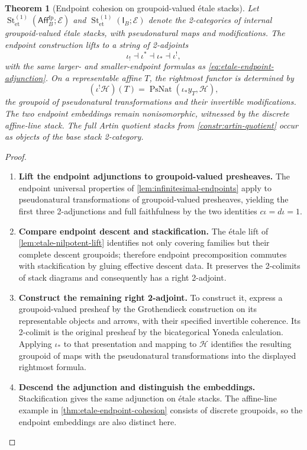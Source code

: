 \documentclass[11pt,a4paper]{article}
\numberwithin{algorithm}{section}
\numberwithin{equation}{section}
\newtheorem{theorem}{Theorem}[section]
\theoremstyle{definition}
\theoremstyle{remark}
\theoremstyle{plain}
\newcommand{\E}{\mathcal E}
\newcommand{\AffB}{\mathsf{Aff}^{\mathrm{fp}}_B}
\newcommand{\InfB}{\mathsf I_B}
\newcommand{\StEt}{\operatorname{St}_{\mathrm{et}}}
\theoremstyle{definition}
\theoremstyle{plain}
\begin{document}
\begin{theorem}[Endpoint cohesion on groupoid-valued \'etale stacks]
\label{thm:etale-stacky-endpoints}
Let $\StEt^{(1)}(\AffB;\E)$ and
$\StEt^{(1)}(\InfB;\E)$ denote the 2-categories of
internal groupoid-valued \'etale stacks, with pseudonatural
maps and modifications.  The endpoint construction lifts to
a string of 2-adjoints
\[
 \iota_!\dashv\iota^*\dashv\iota_*\dashv\iota^!,
\]
with the same larger- and smaller-endpoint formulas as
\eqref{eq:etale-endpoint-adjunction}.  On a representable
affine $T$, the rightmost functor is determined by
\[
 (\iota^!\mathcal H)(T)
 =\operatorname{PsNat}(\iota_*y_T,\mathcal H),
\]
the groupoid of pseudonatural transformations and their
invertible modifications.  The two endpoint embeddings remain
nonisomorphic, witnessed by the discrete affine-line stack.
The full Artin quotient stacks from
\cref{constr:artin-quotient} occur as objects of the base
stack 2-category.
\end{theorem}
\begin{proof}\leavevmode
\begin{enumerate}[leftmargin=*,align=left]
\item \textbf{Lift the endpoint adjunctions to groupoid-valued presheaves.}
The endpoint universal properties of
\cref{lem:infinitesimal-endpoints} apply to pseudonatural
transformations of groupoid-valued presheaves, yielding the
first three 2-adjunctions and full faithfulness by the two
identities $c\iota=d\iota=1$.

\item \textbf{Compare endpoint descent and stackification.}
The \'etale lift of
\cref{lem:etale-nilpotent-lift} identifies not only
covering families but their complete descent groupoids;
therefore endpoint precomposition commutes with stackification
by gluing effective descent data.  It preserves the
2-colimits of stack diagrams and consequently has a right
2-adjoint.

\item \textbf{Construct the remaining right 2-adjoint.}
To construct it, express a groupoid-valued presheaf by the
Grothendieck construction on its representable objects and
arrows, with their specified invertible coherence.  Its
2-colimit is the original presheaf by the bicategorical
Yoneda calculation.  Applying $\iota_*$ to that presentation
and mapping to $\mathcal H$ identifies the resulting groupoid
of maps with the pseudonatural transformations into the
displayed rightmost formula.

\item \textbf{Descend the adjunction and distinguish the embeddings.}
Stackification gives the same
adjunction on \'etale stacks.  The affine-line example in
\cref{thm:etale-endpoint-cohesion} consists of discrete
groupoids, so the endpoint embeddings are also distinct here.
\end{enumerate}
\end{proof}
\end{document}
